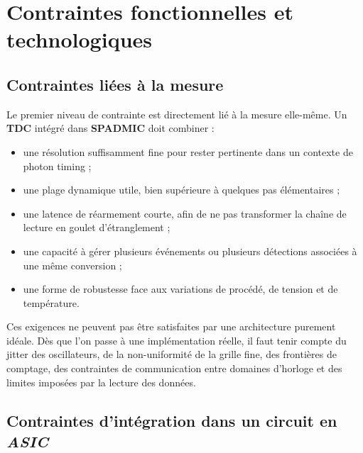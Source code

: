 \section{Contraintes fonctionnelles et technologiques}

\subsection{Contraintes liées à la mesure}

Le premier niveau de contrainte est directement lié à la mesure elle-même. Un \textbf{TDC} intégré dans \textbf{SPADMIC} doit combiner :
\begin{itemize}
    \item une résolution suffisamment fine pour rester pertinente dans un contexte de photon timing ;
    \item une plage dynamique utile, bien supérieure à quelques pas élémentaires ;
    \item une latence de réarmement courte, afin de ne pas transformer la chaîne de lecture en goulet d'étranglement ;
    \item une capacité à gérer plusieurs événements ou plusieurs détections associées à une même conversion ;
    \item une forme de robustesse face aux variations de procédé, de tension et de température.
\end{itemize}

Ces exigences ne peuvent pas être satisfaites par une architecture purement idéale. Dès que l'on passe à une implémentation réelle, il faut tenir compte du jitter des oscillateurs, de la non-uniformité de la grille fine, des frontières de comptage, des contraintes de communication entre domaines d'horloge et des limites imposées par la lecture des données.

\subsection{Contraintes d'intégration dans un circuit en \textit{ASIC}}

